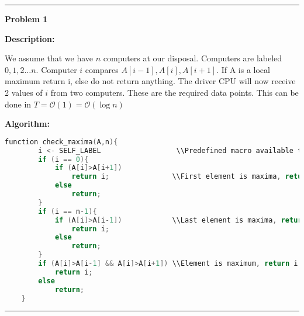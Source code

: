 \documentclass[10pt, a4paper]{article}
\newcommand{\BigO}{\mathcal{O}}
\begin{document}
\noindent\rule{\textwidth}{1px}
\newpage

\noindent\large{\textbf{Problem 1}}
\vspace{5pt}
\normalsize

\noindent\textbf{Description:}

We assume that we have $n$ computers at our disposal. Computers are labeled $0,1,2\dots n$. Computer $i$ compares $A[i-1],A[i],A[i+1]$. If A is a local maximum return i, else do not return anything. The driver CPU will now receive 2 values of $i$ from two computers. These are the required data points. This can be done in $T=\BigO(1)=\BigO(\log n)$

\noindent\textbf{Algorithm:}
\begin{lstlisting}[language=C++,caption=Find two maximas.]
    function check_maxima(A,n){
        i <- SELF_LABEL                  \\Predefined macro available to the computer.
        if (i == 0){
            if (A[i]>A[i+1])
                return i;               \\First element is maxima, return 0
            else
                return;
        }
        if (i == n-1){
            if (A[i]>A[i-1])            \\Last element is maxima, return n-1
                return i;
            else
                return;
        }
        if (A[i]>A[i-1] && A[i]>A[i+1]) \\Element is maximum, return i
            return i;
        else
            return;
    }
\end{lstlisting}

\noindent\rule{\textwidth}{1px}
\end{document}
